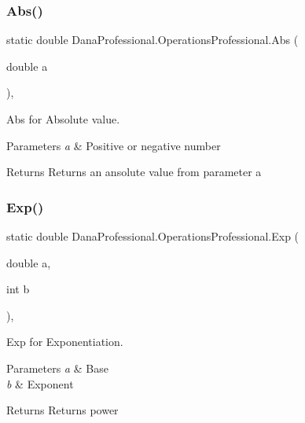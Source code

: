 \subsubsection{\texorpdfstring{Abs()}{Abs()}}
{\footnotesize\ttfamily static double Dana\+Professional.\+Operations\+Professional.\+Abs (\begin{DoxyParamCaption}\item[{double}]{a }\end{DoxyParamCaption})\hspace{0.3cm}{\ttfamily [inline]}, {\ttfamily [static]}}



Abs for Absolute value. 


\begin{DoxyParams}{Parameters}
{\em a} & Positive or negative number \\
\hline
\end{DoxyParams}
\begin{DoxyReturn}{Returns}
Returns an ansolute value from parameter a 
\end{DoxyReturn}
\mbox{\label{classDanaProfessional_1_1OperationsProfessional_a42a851ecd5d926bbf74edad1f8059866}} 
\subsubsection{\texorpdfstring{Exp()}{Exp()}}
{\footnotesize\ttfamily static double Dana\+Professional.\+Operations\+Professional.\+Exp (\begin{DoxyParamCaption}\item[{double}]{a,  }\item[{int}]{b }\end{DoxyParamCaption})\hspace{0.3cm}{\ttfamily [inline]}, {\ttfamily [static]}}



Exp for Exponentiation. 


\begin{DoxyParams}{Parameters}
{\em a} & Base \\
\hline
{\em b} & Exponent \\
\hline
\end{DoxyParams}
\begin{DoxyReturn}{Returns}
Returns power 
\end{DoxyReturn}
\mbox{\label{classDanaProfessional_1_1OperationsProfessional_afc68753ca0f20e400155920ab754ea6b}} 

